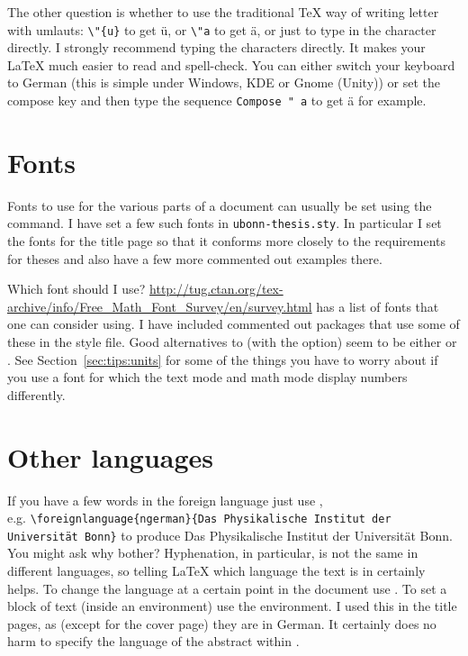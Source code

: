 The other question is whether to use the traditional \TeX{} way of
writing letter with umlauts: \verb+\"{u}+ to get \"{u}, or \verb+\"a+
to get \"a, or just to type in the character directly. I strongly
recommend typing the characters directly. It makes your \LaTeX{} much
easier to read and spell-check. You can either switch your keyboard to
German (this is simple under Windows, KDE or Gnome (Unity)) or set the
compose key and then type the sequence \texttt{Compose " a} to get ä
for example.


\section{Fonts}
\label{sec:layout:font}

Fonts to use for the various parts of a
document can usually be set using the  command. I
have set a few such fonts in \texttt{ubonn-thesis.sty}. In particular
I set the fonts for the title page so that it conforms more closely to
the requirements for theses and also have a few more commented out
examples there.

Which font should I use?
\url{http://tug.ctan.org/tex-archive/info/Free_Math_Font_Survey/en/survey.html}
has a list of fonts that one can consider using. I have included
commented out packages that use some of these in the style file. Good
alternatives to  (with the  option) seem
to be either  or . See
Section~\ref{sec:tips:units} for some of the things you have to worry
about if you use a font for which the text mode and math mode display
numbers differently.


\section{Other languages}
\label{sec:layout:lang}

If you have a few words in the foreign language just use
,\\
e.g. \texttt{\textbackslash foreignlanguage\{ngerman\}\{Das
  Physikalische Institut der Universität Bonn\}}  to produce \foreignlanguage{ngerman}{Das
  Physikalische Institut der Universität Bonn}. You might ask why
bother? Hyphenation, in particular, is not the same in different
languages, so telling \LaTeX{} which language the text is in certainly
helps. To change the language at a certain point in the document use
. To set a block of text (inside an environment)
use the  environment. I used this in the title
pages, as (except for the cover page) they are in German. It certainly
does no harm to specify the language of the abstract
within .

